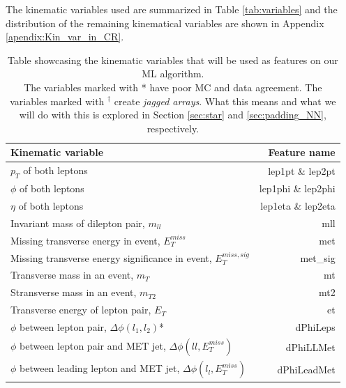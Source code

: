 \documentclass[12pt, a4paper]{book}
\begin{document}
\clearpage\noindent The kinematic variables used are summarized in Table \ref{tab:variables} and the distribution of the remaining kinematical variables are shown in Appendix \ref{apendix:Kin_var_in_CR}.
\begin{table}[!h]
    \centering
    \caption[Kinematic variables used as features]{Table showcasing the kinematic variables that will be used as features on our ML algorithm. \\
    The variables marked with * have poor MC and data agreement. The variables marked with $^\dagger$ create \textit{jagged arrays}. What this means and what we will do with this is explored in Section \ref{sec:star} and \ref{sec:padding_NN}, respectively.}
    \begin{tabular}{l|r}\midrule\midrule
        Kinematic variable                                                              & Feature name          \\\midrule
        $p_T$ of both leptons                                                           & lep1pt \& lep2pt      \\
        $\phi$ of both leptons                                                          & lep1phi \& lep2phi    \\
        $\eta$ of both leptons                                                          & lep1eta \& lep2eta    \\
        Invariant mass of dilepton pair, $m_{ll}$                                       & mll \\
        Missing transverse energy in event, $E_T^{miss}$                                & met \\
        Missing transverse energy significance in event, $E_T^{miss,sig}$               & met\_sig \\
        Transverse mass in an event, $m_T$                                              & mt \\
        Stransverse mass in an event, $m_{T2}$                                          & mt2\\
        Transverse energy of lepton pair, $E_T$                                         & et \\
        $\phi$ between lepton pair, $\Delta\phi(l_1,l_2)$*                              & dPhiLeps \\
        $\phi$ between lepton pair and MET jet, $\Delta\phi(ll,E_T^{miss})$             & dPhiLLMet \\
        $\phi$ between leading lepton and MET jet, $\Delta\phi(l_l,E_T^{miss})$         & dPhiLeadMet \\

\end{tabular}
\end{table}
\end{document}
